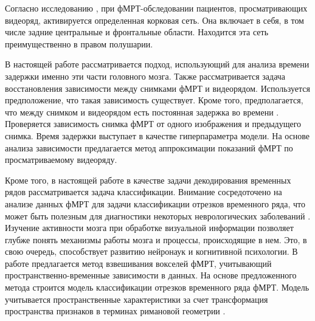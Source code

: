 Согласно исследованию \cite{anderson2006}, при фМРТ-обследовании пациентов,
просматривающих видеоряд, активируется определенная корковая сеть. Она включает
в себя, в том числе задние центральные и фронтальные области. Находится эта сеть
преимущественно в правом полушарии.

В настоящей работе рассматривается подход,
использующий для анализа времени задержки именно эти части головного мозга. Также рассматривается задача восстановления зависимости между снимками фМРТ и видеорядом.
Используется предположение, что такая зависимость существует.
Кроме того, предполагается, что между снимком и видеорядом есть постоянная задержка во времени
\cite{logothetis2003underpinnings}.
Проверяется зависимость снимка фМРТ от одного изображения и предыдущего снимка.
Время задержки выступает в качестве гиперпараметра модели.
На основе анализа зависимости предлагается метод аппроксимации показаний фМРТ по
просматриваемому видеоряду.

Кроме того, в настоящей работе в качестве задачи декодирования временных рядов рассматривается задача классификации. Внимание сосредоточено на анализе данных фМРТ для задачи классификации отрезков временного ряда, что может быть полезным для диагностики некоторых неврологических заболеваний \cite{kloppel2012diagnostic}. Изучение активности мозга при обработке визуальной информации позволяет глубже понять механизмы работы мозга и процессы, происходящие в нем. Это, в свою очередь, способствует развитию нейронаук и когнитивной психологии. В работе предлагается метод взвешивания вокселей фМРТ, учитывающий пространственно-временные зависимости в данных. На основе предложенного метода строится модель классификации отрезков временного ряда фМРТ. Модель учитывается пространственные характеристики за счет трансформация пространства признаков в терминах римановой геометрии \cite{barachant2010riemannian, barachant2011multiclass}.
\newpage

